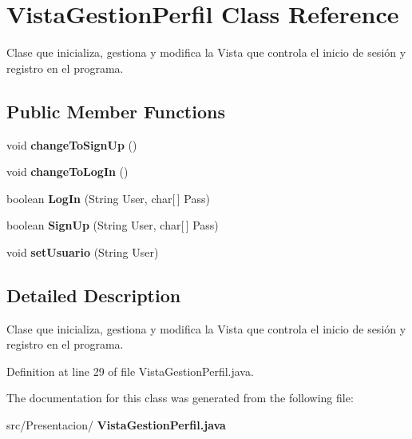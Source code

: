 \section{Vista\+Gestion\+Perfil Class Reference}
\label{class_presentacion_1_1_vista_gestion_perfil}


Clase que inicializa, gestiona y modifica la Vista que controla el inicio de sesión y registro en el programa.  


\subsection*{Public Member Functions}
\begin{DoxyCompactItemize}
\item 
\mbox{\label{class_presentacion_1_1_vista_gestion_perfil_a767cae33dca3e1ae6ef022e0284aa891}} 
void {\bfseries change\+To\+Sign\+Up} ()
\item 
\mbox{\label{class_presentacion_1_1_vista_gestion_perfil_a5792059a35dca9e4c029fdb31a117819}} 
void {\bfseries change\+To\+Log\+In} ()
\item 
\mbox{\label{class_presentacion_1_1_vista_gestion_perfil_ad57530714d88f506d201d718395cf577}} 
boolean {\bfseries Log\+In} (String User, char[$\,$] Pass)
\item 
\mbox{\label{class_presentacion_1_1_vista_gestion_perfil_a8a4e10e8094cac30e3c5536b3a2364ae}} 
boolean {\bfseries Sign\+Up} (String User, char[$\,$] Pass)
\item 
\mbox{\label{class_presentacion_1_1_vista_gestion_perfil_a193026f0fe44beaa3a4b311179200d24}} 
void {\bfseries set\+Usuario} (String User)
\end{DoxyCompactItemize}


\subsection{Detailed Description}
Clase que inicializa, gestiona y modifica la Vista que controla el inicio de sesión y registro en el programa. 

Definition at line 29 of file Vista\+Gestion\+Perfil.\+java.



The documentation for this class was generated from the following file\+:\begin{DoxyCompactItemize}
\item 
src/\+Presentacion/\textbf{ Vista\+Gestion\+Perfil.\+java}\end{DoxyCompactItemize}
